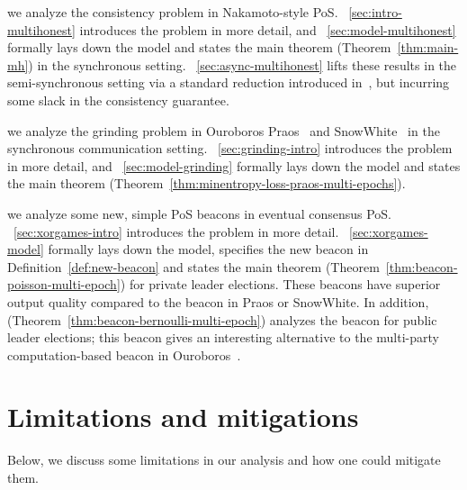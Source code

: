 \begin{description}[font=\normalfont\ ]
  \item[In Part~\ref{part:multihonest},]
    we analyze the consistency problem in Nakamoto-style PoS.
    \Section~\ref{sec:intro-multihonest} introduces the problem in more detail, 
    and \Section~\ref{sec:model-multihonest} formally lays down the model and 
    states the main theorem (Theorem~\ref{thm:main-mh}) in the synchronous setting.
    \Section~\ref{sec:async-multihonest} lifts these results in the semi-synchronous setting 
    via a standard reduction introduced in~\cite{Praos}, 
    but incurring some slack in the consistency guarantee. 
  
  \item[In Part~\ref{part:praos},]
    we analyze the grinding problem in Ouroboros Praos~\cite{Praos} and SnowWhite~\cite{SnowWhite} 
    in the synchronous communication setting.
    \Section~\ref{sec:grinding-intro} introduces the problem in more detail, 
    and \Section~\ref{sec:model-grinding} formally lays down the model and 
    states the main theorem (Theorem~\ref{thm:minentropy-loss-praos-multi-epochs}). 

  \item[In Part~\ref{part:xorgames},]
    we analyze some new, simple PoS beacons in eventual consensus PoS. 
    \Section~\ref{sec:xorgames-intro} introduces the problem in more detail. 
    \Section~\ref{sec:xorgames-model} formally lays down the model, 
    specifies the new beacon in Definition~\ref{def:new-beacon} and 
    states the main theorem (Theorem~\ref{thm:beacon-poisson-multi-epoch}) 
    for private leader elections.
    These beacons have superior output quality compared to the beacon in Praos or SnowWhite. 
    In addition, (Theorem~\ref{thm:beacon-bernoulli-multi-epoch}) 
    analyzes the beacon for public leader elections; 
    this beacon gives an interesting alternative to the multi-party computation-based 
    beacon in Ouroboros~\cite{Ouroboros}.
\end{description}




\section{Limitations and mitigations}
Below, we discuss some limitations in our analysis 
and how one could mitigate them.


